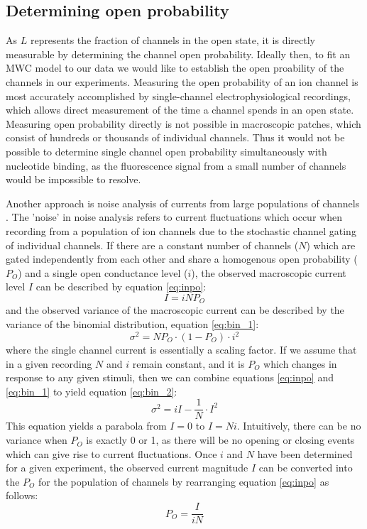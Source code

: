 \subsection{Determining open probability}

As $L$ represents the fraction of channels in the open state, it is directly measurable by determining the channel open probability.
Ideally then, to fit an MWC model to our data we would like to establish the open proability of the channels in our experiments.
Measuring the open probability of an ion channel is most accurately accomplished by single-channel electrophysiological recordings, which allows direct measurement of the time a channel spends in an open state.
Measuring open probability directly is not possible in macroscopic patches, which consist of hundreds or thousands of individual channels.
Thus it would not be possible to determine single channel open probability simultaneously with nucleotide binding, as the fluorescence signal from a small number of channels would be impossible to resolve.

Another approach is noise analysis of currents from large populations of channels \cite{heinemann_7_1992, alvarez_counting_2002}.
The 'noise' in noise analysis refers to current fluctuations which occur when recording from a population of ion channels due to the stochastic channel gating of individual channels.
If there are a constant number of channels ($N$) which are gated independently from each other and share a homogenous open probability ($P_O$) and a single open conductance level ($i$), the observed macroscopic current level $I$ can be described by equation \ref{eq:inpo}:
\begin{equation}\label{eq:inpo}
	I = iNP_O
\end{equation}
and the observed variance of the macroscopic current can be described by the variance of the binomial distribution, equation \ref{eq:bin_1}:
\begin{equation}\label{eq:bin_1}
	\sigma^2 = NP_O \cdot (1 - P_O) \cdot i^2
\end{equation}
where the single channel current is essentially a scaling factor.
If we assume that in a given recording $N$ and $i$ remain constant, and it is $P_O$ which changes in response to any given stimuli, then we can combine equations \ref{eq:inpo} and \ref{eq:bin_1} to yield equation \ref{eq:bin_2}:
\begin{equation}\label{eq:bin_2}
	\sigma^2 = iI - \frac{1}{N} \cdot I^2
\end{equation}
This equation yields a parabola from $I = 0$ to $I = Ni$.
Intuitively, there can be no variance when $P_O$ is exactly 0 or 1, as there will be no opening or closing events which can give rise to current fluctuations.
Once $i$ and $N$ have been determined for a given experiment, the observed current magnitude $I$ can be converted into the $P_O$ for the population of channels by rearranging equation \ref{eq:inpo} as follows:
\begin{equation}\label{eq:poin}
	P_O = \frac{I}{iN}
\end{equation}

